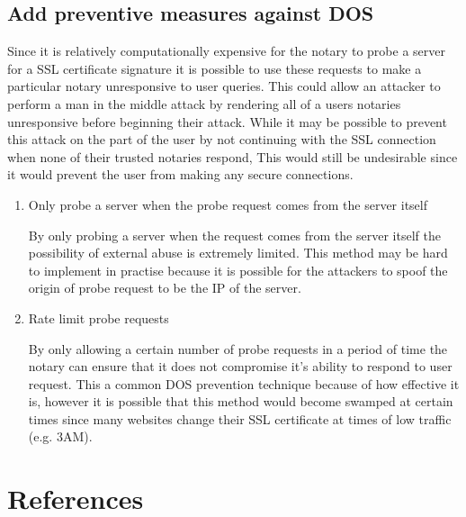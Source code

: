 \documentclass[preprint,review,12pt]{elsarticle}
\begin{document}
\subsection{Add preventive measures against DOS}

Since it is relatively computationally expensive for the notary to probe a
server for a SSL certificate signature it is possible to use these requests to
make a particular notary unresponsive to user queries. This could allow an
attacker to perform a man in the middle attack by rendering all of a users
notaries unresponsive before beginning their attack. While it may be possible
to prevent this attack on the part of the user by not continuing with the SSL
connection when none of their trusted notaries respond, This would still be
undesirable since it would prevent the user from making any secure connections.

\begin{enumerate}
    \item {Only probe a server when the probe request comes from the server itself}

        By only probing a server when the request comes from the server itself
        the possibility of external abuse is extremely limited. This method may
        be hard to implement in practise because it is possible for the
        attackers to spoof the origin of probe request to be the IP of the
        server.

    \item {Rate limit probe requests}

        By only allowing a certain number of probe requests in a period of time
        the notary can ensure that it does not compromise it's ability to
        respond to user request. This a common DOS prevention technique because
        of how effective it is, however it is possible that this method would
        become swamped at certain times since many websites change their SSL
        certificate at times of low traffic (e.g. 3AM).

\end{enumerate}

\section{References}
\label{references}
\nocite{*}


\end{document}
